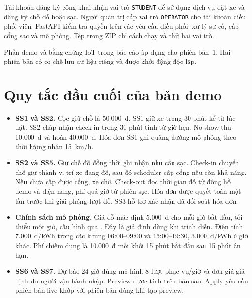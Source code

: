 Tài khoản đăng ký công khai nhận vai trò \texttt{STUDENT} để sử dụng dịch vụ
đặt xe và đăng ký chỗ đỗ hoặc sạc. Người quản trị cấp vai trò
\texttt{OPERATOR} cho tài khoản điều phối viên. FastAPI kiểm tra quyền trên
các yêu cầu điều phối, xử lý sự cố, cấp cổng sạc và mô phỏng.
Tệp  trong ZIP chỉ cách chạy và thử hai vai trò.

Phần demo và bằng chứng IoT trong báo cáo áp dụng cho phiên bản~1.
Hai phiên bản có cơ chế lưu dữ liệu riêng và được khởi động độc lập.

\section{Quy tắc đầu cuối của bản demo}
\begin{itemize}
\item \textbf{SS1 và SS2.} Cọc giữ chỗ là 50.000~đ. SS1 giữ xe trong 30 phút
kể từ lúc đặt. SS2 chấp nhận check-in trong 30 phút tính từ giờ hẹn.
No-show thu 10.000~đ và hoàn 40.000~đ. Hóa đơn SS1 ghi quãng đường mô phỏng theo
thời lượng nhân 15~km/h.
\item \textbf{SS2 và SS5.} Giữ chỗ đỗ đồng thời ghi nhận nhu cầu sạc. Check-in
chuyển chỗ giữ thành vị trí xe đang đỗ, sau đó scheduler cấp cổng nếu còn khả năng.
Nếu chưa cấp được cổng, xe chờ. Check-out đọc thời gian đỗ từ đồng hồ demo và
điện năng, phí quá giờ từ phiên sạc. Hóa đơn được quyết toán một lần trước khi
giải phóng lượt đỗ. SS3 hỗ trợ xác nhận đã đối soát hóa đơn.
\item \textbf{Chính sách mô phỏng.} Giá đỗ mặc định 5.000~đ cho mỗi giờ bắt đầu,
tối thiểu một giờ, cấu hình qua . Đây là giả định
dùng khi trình diễn. Điện tính 7.000~đ/kWh trong các khung 06:00--09:00 và
16:00--19:30, 3.000~đ/kWh ở giờ khác. Phí chiếm dụng là 10.000~đ mỗi khối
15 phút bắt đầu sau 15 phút ân hạn.
\item \textbf{SS6 và SS7.} Dự báo 24 giờ dùng mô hình 8 lượt phục vụ/giờ và
đơn giá giả định do người vận hành nhập. Preview được tính trên bản sao.
Apply yêu cầu phiên bản live khớp với phiên bản dùng khi tạo preview.
\end{itemize}

